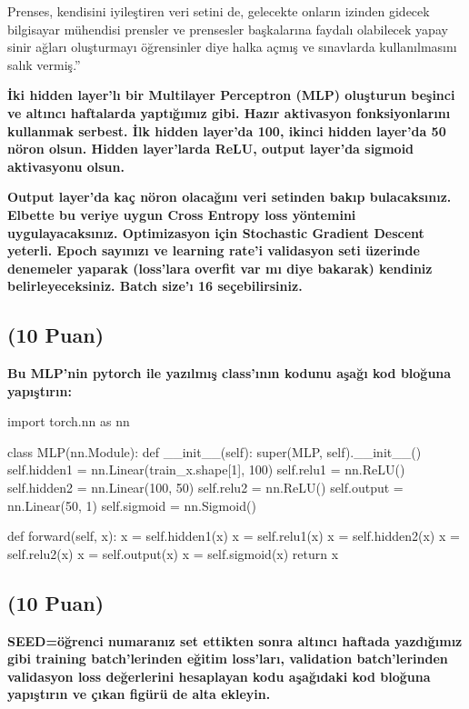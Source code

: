 \documentclass[11pt]{article}
\begin{document}
Prenses, kendisini iyileştiren veri setini de, gelecekte onların izinden gidecek bilgisayar mühendisi prensler ve prensesler başkalarına faydalı olabilecek yapay sinir ağları oluşturmayı öğrensinler diye halka açmış ve sınavlarda kullanılmasını salık vermiş.''

\textbf{İki hidden layer'lı bir Multilayer Perceptron (MLP) oluşturun beşinci ve altıncı haftalarda yaptığımız gibi. Hazır aktivasyon fonksiyonlarını kullanmak serbest. İlk hidden layer'da 100, ikinci hidden layer'da 50 nöron olsun. Hidden layer'larda ReLU, output layer'da sigmoid aktivasyonu olsun.}

\textbf{Output layer'da kaç nöron olacağını veri setinden bakıp bulacaksınız. Elbette bu veriye uygun Cross Entropy loss yöntemini uygulayacaksınız. Optimizasyon için Stochastic Gradient Descent yeterli. Epoch sayınızı ve learning rate'i validasyon seti üzerinde denemeler yaparak (loss'lara overfit var mı diye bakarak) kendiniz belirleyeceksiniz. Batch size'ı 16 seçebilirsiniz.}

\subsection{(10 Puan)} \textbf{Bu MLP'nin pytorch ile yazılmış class'ının kodunu aşağı kod bloğuna yapıştırın:}

\begin{python}
import torch.nn as nn

class MLP(nn.Module):
    def __init__(self):
        super(MLP, self).__init__()
        self.hidden1 = nn.Linear(train_x.shape[1], 100)
        self.relu1 = nn.ReLU()
        self.hidden2 = nn.Linear(100, 50)
        self.relu2 = nn.ReLU()
        self.output = nn.Linear(50, 1)
        self.sigmoid = nn.Sigmoid()

    def forward(self, x):
        x = self.hidden1(x)
        x = self.relu1(x)
        x = self.hidden2(x)
        x = self.relu2(x)
        x = self.output(x)
        x = self.sigmoid(x)
        return x
\end{python}

\subsection{(10 Puan)} \textbf{SEED=öğrenci numaranız set ettikten sonra altıncı haftada yazdığımız gibi training batch'lerinden eğitim loss'ları, validation batch'lerinden validasyon loss değerlerini hesaplayan kodu aşağıdaki kod bloğuna yapıştırın ve çıkan figürü de alta ekleyin.}
\end{document}
